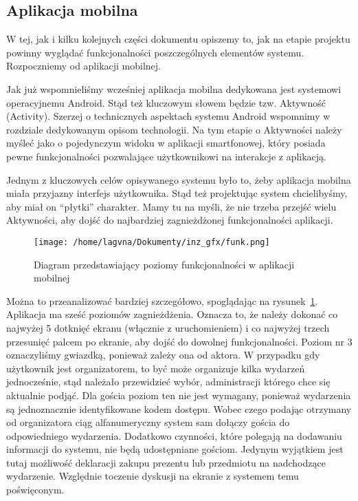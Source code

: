 \documentclass[12pt,titlepage]{article}
\begin{document}

\subsection{Aplikacja mobilna}
W tej, jak i kilku kolejnych części dokumentu opiszemy to, jak na etapie projektu powinny wyglądać funkcjonalności poszczególnych elementów systemu. Rozpoczniemy od aplikacji mobilnej.

Jak już wspomnieliśmy wcześniej aplikacja mobilna dedykowana jest systemowi operacyjnemu Android. Stąd też kluczowym słowem będzie tzw. Aktywność (Activity). Szerzej o technicznych aspektach
systemu Android wspomnimy w rozdziale dedykowanym opisom technologii. Na tym etapie o Aktywności należy myśleć jako o pojedynczym widoku w aplikacji smartfonowej, który posiada pewne funkcjonalności
pozwalające użytkownikowi na interakcje z aplikacją.

Jednym z kluczowych celów opisywanego systemu było to, żeby aplikacja mobilna miała przyjazny interfejs użytkownika. Stąd też projektując system chcielibyśmy, aby miał on ``płytki'' charakter.
Mamy tu na myśli, że nie trzeba przejść wielu Aktywności, aby dojść do najbardziej zagnieżdżonej funkcjonalności aplikacji.

\begin{figure}
\begin{center}
 \texttt{[image: /home/lagvna/Dokumenty/inz\_gfx/funk.png]}
 \caption{Diagram przedstawiający poziomy funkcjonalności w aplikacji mobilnej}
 \label{fig:funk}
\end{center}
\end{figure}

Można to przeanalizować bardziej szczegółowo, spoglądając na rysunek~\ref{fig:funk}. Aplikacja ma sześć poziomów zagnieżdżenia. Oznacza to, że należy dokonać co najwyżej 5 dotknięć ekranu 
(włącznie z uruchomieniem) i co najwyżej trzech przesunięć palcem po ekranie, aby dojść do dowolnej funkcjonalności. Poziom nr 3 oznaczyliśmy gwiazdką, ponieważ zależy ona od aktora.
W przypadku gdy użytkownik jest organizatorem, to być może organizuje kilka wydarzeń jednocześnie, stąd należało przewidzieć wybór, administracji którego chce się aktualnie podjąć.
Dla gościa poziom ten nie jest wymagany, ponieważ wydarzenia są jednoznacznie identyfikowane kodem dostępu. Wobec czego podając otrzymany od organizatora ciąg alfanumeryczny system
sam dołączy gościa do odpowiedniego wydarzenia.
Dodatkowo czynności, które polegają na dodawaniu informacji do systemu, nie będą udostępniane gościom. Jedynym wyjątkiem jest tutaj możliwość deklaracji zakupu prezentu lub przedmiotu
na nadchodzące wydarzenie. Względnie toczenie dyskusji na ekranie z systemem temu poświęconym.
\end{document}
